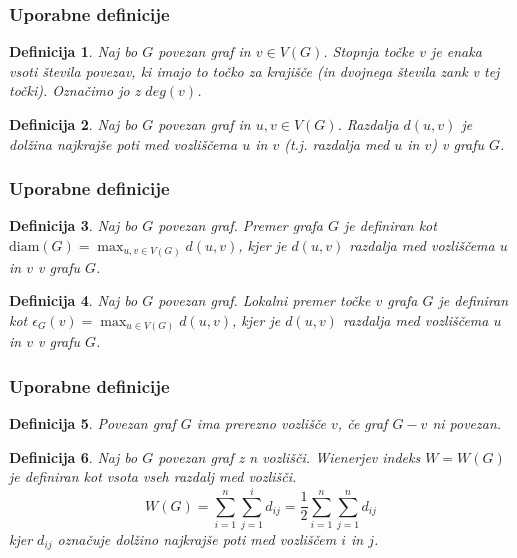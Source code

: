 \documentclass[12pt, hyperref={unicode}]{beamer}
\newtheorem{definicija}{Definicija}
\begin{document}
\begin{frame}
   
    \frametitle{Uporabne definicije}
    \begin{definicija}
    Naj bo $G$ povezan graf in $v \in V(G)$. Stopnja točke $v$ je enaka vsoti števila povezav, ki imajo to točko za krajišče (in dvojnega števila zank v tej točki).
    Označimo jo z $deg(v)$.
    \end{definicija}
    
    \begin{definicija}
    Naj bo $G$ povezan graf in $u, v \in V(G)$. Razdalja $d(u, v)$ je dolžina najkrajše poti med vozliščema $u$ in $v$ (t.j. razdalja med $u$ in $v$) v grafu $G$.
    \end{definicija}

\end{frame}

\begin{frame}
   
    \frametitle{Uporabne definicije}
    \begin{definicija}
    Naj bo $G$ povezan graf. Premer grafa $G$ je definiran kot $\text{diam}(G) = \max_{u, v \in V(G)} d(u, v)$, kjer je $d(u, v)$ razdalja med vozliščema $u$ in $v$ v grafu $G$.
    \end{definicija}
    
    \begin{definicija}
    Naj bo $G$ povezan graf. Lokalni premer točke $v$ grafa $G$ je definiran kot $\epsilon_G(v) = \max_{u \in V(G)} d(u, v)$, kjer je $d(u, v)$ razdalja med vozliščema $u$ in $v$ v grafu $G$.
    \end{definicija}
    
    

\end{frame}

\begin{frame}
   
    \frametitle{Uporabne definicije}
    \begin{definicija}
    Povezan graf $G$ ima prerezno vozlišče $v$, če graf $G - v$ ni povezan.
    \end{definicija}

    \begin{definicija}
    Naj bo $G$ povezan graf z n vozlišči. Wienerjev indeks $W = W(G)$ je definiran
    kot vsota vseh razdalj med vozlišči.
    $$W(G) = \sum_{i=1}^{n} \sum_{j=1}^{i} d_{ij} = \frac{1}{2} \sum_{i=1}^{n} \sum_{j=1}^{n} d_{ij}$$
    kjer $d_{ij}$ označuje dolžino najkrajše poti med vozliščem $i$ in $j$.
    \end{definicija}

\end{frame}
\end{document}
